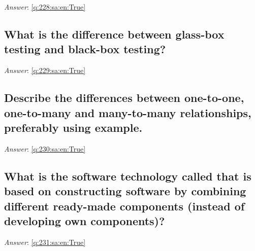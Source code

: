 \documentclass[a4paper,11pt,oneside]{article}
\begin{document}
\begin{sloppypar}
\vspace{1cm}

\textit{Answer}: \autoref{q:228:sa:en:True}



\subsection{What is the difference between glass-box testing and black-box testing?}

\label{q:229:sa:en:False}

\vspace{2cm}

\noindent\makebox[\textwidth]{\hrulefill}

\vspace{1cm}

\textit{Answer}: \autoref{q:229:sa:en:True}



\subsection{Describe the differences between one-to-one, one-to-many and many-to-many relationships, preferably using example.}

\label{q:230:sa:en:False}

\vspace{2cm}

\noindent\makebox[\textwidth]{\hrulefill}

\vspace{1cm}

\textit{Answer}: \autoref{q:230:sa:en:True}



\subsection{What is the software technology called that is based on constructing software by combining different ready-made components (instead of developing own components)?}

\label{q:231:sa:en:False}

\vspace{2cm}

\noindent\makebox[\textwidth]{\hrulefill}

\vspace{1cm}

\textit{Answer}: \autoref{q:231:sa:en:True}




\end{sloppypar}
\end{document}
